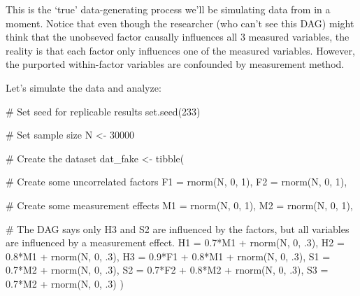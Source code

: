 \documentclass[
  letterpaper,
  DIV=11,
  numbers=noendperiod]{scrreprt}
\newenvironment{Shaded}{\begin{snugshade}}{\end{snugshade}}
\newcommand{\AttributeTok}[1]{\textcolor[rgb]{0.40,0.45,0.13}{#1}}
\newcommand{\CommentTok}[1]{\textcolor[rgb]{0.37,0.37,0.37}{#1}}
\newcommand{\DecValTok}[1]{\textcolor[rgb]{0.68,0.00,0.00}{#1}}
\newcommand{\FloatTok}[1]{\textcolor[rgb]{0.68,0.00,0.00}{#1}}
\newcommand{\FunctionTok}[1]{\textcolor[rgb]{0.28,0.35,0.67}{#1}}
\newcommand{\NormalTok}[1]{\textcolor[rgb]{0.00,0.23,0.31}{#1}}
\newcommand{\OtherTok}[1]{\textcolor[rgb]{0.00,0.23,0.31}{#1}}
\newcommand{\SpecialCharTok}[1]{\textcolor[rgb]{0.37,0.37,0.37}{#1}}
\begin{document}
This is the `true' data-generating process we'll be simulating data from
in a moment. Notice that even though the researcher (who can't see this
DAG) might think that the unobseved factor causally influences all 3
measured variables, the reality is that each factor only influences one
of the measured variables. However, the purported within-factor
variables are confounded by measurement method.

Let's simulate the data and analyze:

\begin{Shaded}
\begin{Highlighting}[]
\CommentTok{\# Set seed for replicable results}
\FunctionTok{set.seed}\NormalTok{(}\DecValTok{233}\NormalTok{)}

\CommentTok{\# Set sample size}
\NormalTok{N }\OtherTok{\textless{}{-}} \DecValTok{30000}

\CommentTok{\# Create the dataset}
\NormalTok{dat\_fake }\OtherTok{\textless{}{-}} \FunctionTok{tibble}\NormalTok{(}
  
  \CommentTok{\# Create some uncorrelated factors}
  \AttributeTok{F1 =} \FunctionTok{rnorm}\NormalTok{(N, }\DecValTok{0}\NormalTok{, }\DecValTok{1}\NormalTok{),}
  \AttributeTok{F2 =} \FunctionTok{rnorm}\NormalTok{(N, }\DecValTok{0}\NormalTok{, }\DecValTok{1}\NormalTok{),}
  
  \CommentTok{\# Create some measurement effects}
  \AttributeTok{M1 =} \FunctionTok{rnorm}\NormalTok{(N, }\DecValTok{0}\NormalTok{, }\DecValTok{1}\NormalTok{),}
  \AttributeTok{M2 =} \FunctionTok{rnorm}\NormalTok{(N, }\DecValTok{0}\NormalTok{, }\DecValTok{1}\NormalTok{),}
  
  \CommentTok{\# The DAG says only H3 and S2 are influenced by the factors, but all variables are influenced by a measurement effect.}
  \AttributeTok{H1 =} \FloatTok{0.7}\SpecialCharTok{*}\NormalTok{M1 }\SpecialCharTok{+} \FunctionTok{rnorm}\NormalTok{(N, }\DecValTok{0}\NormalTok{, .}\DecValTok{3}\NormalTok{),}
  \AttributeTok{H2 =} \FloatTok{0.8}\SpecialCharTok{*}\NormalTok{M1 }\SpecialCharTok{+} \FunctionTok{rnorm}\NormalTok{(N, }\DecValTok{0}\NormalTok{, .}\DecValTok{3}\NormalTok{),}
  \AttributeTok{H3 =} \FloatTok{0.9}\SpecialCharTok{*}\NormalTok{F1 }\SpecialCharTok{+} \FloatTok{0.8}\SpecialCharTok{*}\NormalTok{M1 }\SpecialCharTok{+} \FunctionTok{rnorm}\NormalTok{(N, }\DecValTok{0}\NormalTok{, .}\DecValTok{3}\NormalTok{),}
  \AttributeTok{S1 =} \FloatTok{0.7}\SpecialCharTok{*}\NormalTok{M2 }\SpecialCharTok{+} \FunctionTok{rnorm}\NormalTok{(N, }\DecValTok{0}\NormalTok{, .}\DecValTok{3}\NormalTok{),}
  \AttributeTok{S2 =} \FloatTok{0.7}\SpecialCharTok{*}\NormalTok{F2 }\SpecialCharTok{+} \FloatTok{0.8}\SpecialCharTok{*}\NormalTok{M2 }\SpecialCharTok{+} \FunctionTok{rnorm}\NormalTok{(N, }\DecValTok{0}\NormalTok{, .}\DecValTok{3}\NormalTok{),}
  \AttributeTok{S3 =} \FloatTok{0.7}\SpecialCharTok{*}\NormalTok{M2 }\SpecialCharTok{+} \FunctionTok{rnorm}\NormalTok{(N, }\DecValTok{0}\NormalTok{, .}\DecValTok{3}\NormalTok{) }
\NormalTok{) }
\end{Highlighting}
\end{Shaded}
\end{document}
